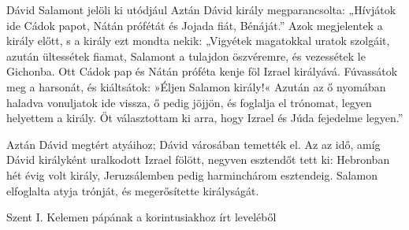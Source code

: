 \documentclass[twoside]{article}
\begin{document}
\begin{lectio}{Dávid Salamont jelöli ki utódjául}
Aztán Dávid király megparancsolta: „Hívjátok ide Cádok papot, Nátán prófétát és Jojada fiát, Bénáját.” Azok megjelentek a király előtt, s a király ezt mondta nekik: „Vigyétek magatokkal uratok szolgáit, azután ültessétek fiamat, Salamont a tulajdon öszvéremre, és vezessétek le Gichonba. Ott Cádok pap és Nátán próféta kenje föl Izrael királyává. Fúvassátok meg a harsonát, és kiáltsátok: »Éljen Salamon király!« Azután az ő nyomában haladva vonuljatok ide vissza, ő pedig jöjjön, és foglalja el trónomat, legyen helyettem a király. Őt választottam ki arra, hogy Izrael és Júda fejedelme legyen.”

Aztán Dávid megtért atyáihoz; Dávid városában temették el. Az az idő, amíg Dávid királyként uralkodott Izrael fölött, negyven esztendőt tett ki: Hebronban hét évig volt király, Jeruzsálemben pedig harminchárom esztendeig. Salamon elfoglalta atyja trónját, és megerősítette királyságát.
\end{lectio}



Szent I. Kelemen pápának a korintusiakhoz írt leveléből

{\centering{}}
\end{document}
